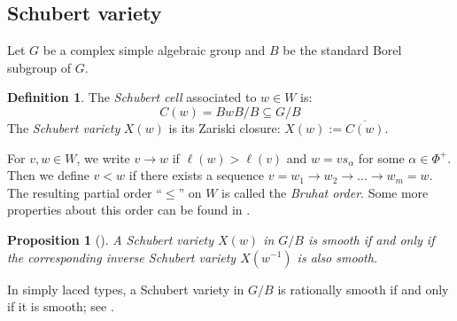 \documentclass[11pt, reqno]{amsart}
\renewcommand{\subset}{\subseteq}
\newtheorem{prop}[Thm]{Proposition}
\theoremstyle{definition}
\newtheorem{dfn}[Thm]{Definition}
\numberwithin{equation}{section}
\begin{document}
 


\subsection{Schubert variety}	
	
Let $G$ be a complex simple algebraic group and $ B$ be  the standard Borel subgroup of $G$.

\begin{dfn}
The \textit{ Schubert cell} associated to $w \in W$ is:
\[
C(w) = B w B /B\subset G/B
\]
The \textit{Schubert variety} $X(w)$ is its Zariski closure: $X(w) := \overline{C(w)}$.
\end{dfn}





For $v,w\in W$, we write $v\rightarrow w$ if $\ell(w)>\ell(v)$ and $w=vs_\alpha$ for some $\alpha\in \Phi^+$.
Then we define $v<w$ if there exists a sequence $v=w_1\rightarrow w_2\rightarrow\ldots \rightarrow w_m=w$.
The resulting partial order ``$\leq$'' on $W$ is called the {\it Bruhat order\/}. Some more properties about this order can be found in \cite[Chap. 2]{BB05}.


\begin{prop}[{\cite[Cor. 4]{Ca-11}}]\label{inverse}
    A Schubert variety $X(w)$ in $G/B$ is smooth if and only if the corresponding inverse Schubert variety $X(w^{-1})$ is also smooth.
\end{prop}



In simply laced types,  a Schubert variety in $G/B$ is rationally smooth if and only if it is smooth; see \cite{CK03}.



\end{document}

